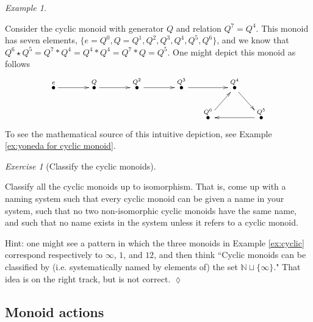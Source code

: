\documentclass{book}
\def\NN{{\mathbb N}}
\newcommand{\LMO}[1]{\stackrel{#1}{\bullet}}
\theoremstyle{remark}
\newtheorem{example}[subsubsection]{Example}
\newtheorem{exc}[subsubsection]{Exercise}
\newenvironment{exercise}{\begin{exc}}{\hspace*{\fill}$\lozenge$\end{exc}}
\theoremstyle{definition}
\begin{document}
\begin{example}\label{ex:cyclic monoid (7,4)}

Consider the cyclic monoid with generator $Q$ and relation $Q^7=Q^4$. This monoid has seven elements, $\{e=Q^0,Q=Q^1, Q^2, Q^3, Q^4, Q^5, Q^6\}$, and we know that $Q^6\star Q^5=Q^7*Q^4=Q^4*Q^4=Q^7*Q=Q^5.$ One might depict this monoid as follows
$$\xymatrix@=15pt{
\LMO{e}\ar[rr]&&\LMO{Q}\ar[rr]&&\LMO{Q^2}\ar[rr]&&\LMO{Q^3}\ar[rr]&&\LMO{Q^4}\ar[dr]\\
&&&&&&&\LMO{Q^6}\ar[ur]&&\LMO{Q^5}\ar[ll]
}
$$
To see the mathematical source of this intuitive depiction, see Example \ref{ex:yoneda for cyclic monoid}.

\end{example}

\begin{exercise}[Classify the cyclic monoids]\label{exc:classify cyclic}

Classify all the cyclic monoids up to isomorphism. That is, come up with a naming system such that every cyclic monoid can be given a name in your system, such that no two non-isomorphic cyclic monoids have the same name, and such that no name exists in the system unless it refers to a cyclic monoid. 

Hint: one might see a pattern in which the three monoids in Example \ref{ex:cyclic} correspond respectively to $\infty$, $1$, and $12$, and then think ``Cyclic monoids can be classified by (i.e. systematically named by elements of) the set $\NN\sqcup\{\infty\}$." That idea is on the right track, but is not correct.
\end{exercise}


\subsection{Monoid actions}
\end{document}
